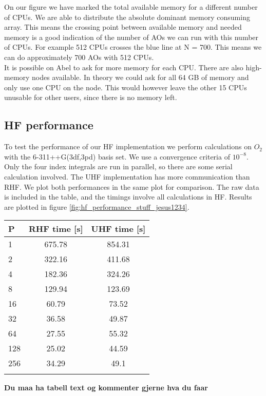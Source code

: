 On our figure we have marked the total available memory for a
different number of CPUs. We are able to distribute the absolute
dominant memory consuming array. This means the crossing point between
available memory and needed memory is a good indication of the number
of AOs we can run with this number of CPUs. For example 512 CPUs
crosses the blue line at N = 700. This means we can do approximately
700 AOs with 512 CPUs. \\

It is possible on Abel to ask for more memory for each CPU. There are
also high-memory nodes available. In theory we could ask for all 64 GB
of memory and only use one CPU on the node. This would however leave
the other 15 CPUs unusable for other users, since there is no memory
left.

\subsection{HF performance}
To test the performance of our HF implementation we perform
calculations on $O_2$ with the 6-311++G(3df,3pd) basis set. We use
a convergence criteria of $10^{-8}$. Only the four index integrals are
run in parallel, so there are some serial calculation involved. The
UHF implementation has more communication than RHF. We plot both
performances in the same plot for comparison. The raw data is included
in the table, and the timings involve all calculations in HF. Results
are plotted in figure \ref{fig:hf_performance_stuff_jesus1234}.

\begin{center}
\begin{tabular}{ l c c }
	\hline
  	P & RHF time [s] & UHF time [s] \\ \hline
  	1 & 675.78 & 854.31 \\ 
  	2 & 322.16 & 411.68 \\ 
  	4 & 182.36 & 324.26 \\
  	8 & 129.94 & 123.69 \\ 
  	16 & 60.79 & 73.52 \\ 
  	32 & 36.58 & 49.87 \\ 
  	64 & 27.55 & 55.32 \\ 
  	128 & 25.02 & 44.59 \\
  	256 & 34.29 & 49.1  \\ \hline
  	\\
	\end{tabular}
\end{center}
{\bf Du maa ha tabell text og kommenter gjerne hva du faar}
\newpage

